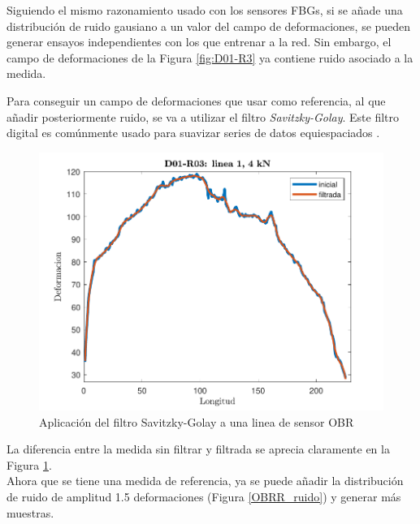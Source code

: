 Siguiendo el mismo razonamiento usado con los sensores FBGs, si se añade una distribución de ruido gausiano a un valor del campo de deformaciones, se pueden generar ensayos independientes con los que entrenar a la red. Sin embargo, el campo de deformaciones de la Figura \ref{fig:D01-R3} ya contiene ruido asociado a la medida. 

Para conseguir un campo de deformaciones que usar como referencia, al que añadir posteriormente ruido, se va a utilizar el filtro \textit{Savitzky-Golay}. Este filtro digital es comúnmente usado para suavizar series de datos equiespaciados \cite{Savitzky-Golay}.

\begin{figure}[h!]
    \centering
    \includegraphics[width=125mm, angle=0]{3/Fotos/filtro.pdf}
    \captionsetup{justification=centering,margin=1.25cm}
    \caption{Aplicación del filtro Savitzky-Golay a una linea de sensor OBR}
    \label{fig:filtro}
\end{figure}

La diferencia entre la medida sin filtrar y filtrada se aprecia claramente en la Figura \ref{fig:filtro}.\\

Ahora que se tiene una medida de referencia, ya se puede añadir la distribución de ruido de amplitud 1.5 deformaciones (Figura \ref{OBRR_ruido}) y generar más muestras.
    
